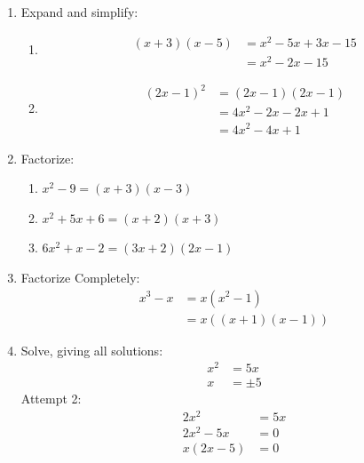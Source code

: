 \documentclass{article}
\begin{document}
\begin{enumerate}
  \item Expand and simplify:
  \begin{enumerate}[label=\alph*)]
    \item \begin{align*}
        (x + 3)(x - 5) &= x^{2} - 5x + 3x - 15 \\
                        &= x^{2} -2x -15
      \end{align*}

    \item \begin{align*}
        (2x - 1)^{2} &= (2x - 1)(2x - 1) \\
                  &= 4x^{2} - 2x - 2x + 1 \\
                  &= 4x^{2} - 4x + 1
      \end{align*}
  \end{enumerate}

  \item Factorize:
    \begin{enumerate}[label=\alph*)]
      \item $x^{2} - 9 = (x + 3)(x - 3)$
      \item $x^{2} + 5x + 6 = (x + 2)(x + 3)$
      \item $6x^{2} + x - 2 = (3x + 2)(2x - 1)$
    \end{enumerate}

  \item Factorize Completely: 
    \begin{align*}
      x^{3} - x &= x(x^{2} - 1) \\
      &= x((x + 1)(x - 1))
    \end{align*}
    


  \item Solve, giving all solutions:
    \begin{align*}
      x^{2} &= 5x \\
      x  &= \pm5
    \end{align*}
    Attempt 2:
    \begin{align*}
      2x^{2} &= 5x \\
      2x^{2} - 5x &= 0 \\
      x(2x - 5) &= 0 
    \end{align*}
    


\end{enumerate}
\end{document}
